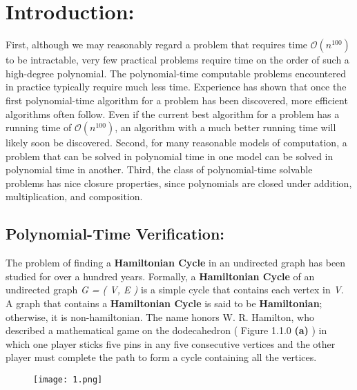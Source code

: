 \section{Introduction:}

First, although we may reasonably regard a problem that requires time {\bfseries $\mathcal{O}(n^{100})$} to be intractable, very few practical problems require time on the order of such a high-degree polynomial. The polynomial-time computable problems encountered in practice typically require much less time. Experience has shown that once the first polynomial-time algorithm for a problem has been discovered, more efficient algorithms often follow. Even if the current best algorithm for a problem has a running time of {\bfseries $\mathcal{O}(n^{100})$}, an algorithm with a much better running time will likely soon be discovered. Second, for many reasonable models of computation, a problem that can be solved in polynomial time in one model can be solved in polynomial time in another. Third, the class of polynomial-time solvable problems has nice closure properties, since polynomials are closed under addition, multiplication, and composition. \hfill \break

\subsection{Polynomial-Time Verification:}

The problem of finding a {\bfseries Hamiltonian Cycle} in an undirected graph has been studied for over a hundred years. Formally, a {\bfseries Hamiltonian Cycle} of an undirected graph {\itshape G = ( V, E )} is a simple cycle that contains each vertex in {\itshape V}. A graph that contains a {\bfseries Hamiltonian Cycle} is said to be {\bfseries Hamiltonian}; otherwise, it is non-hamiltonian. The name honors W. R. Hamilton, who described a mathematical game on the dodecahedron ( Figure 1.1.0 {\bfseries (a)} ) in which one player sticks five pins in any five consecutive vertices and the other player must complete the path to form a cycle containing all the vertices.

\begin{figure}[H]
\texttt{[image: 1.png]}
\centering \linebreak {} \hfill \break
\end{figure} \hfill \break

